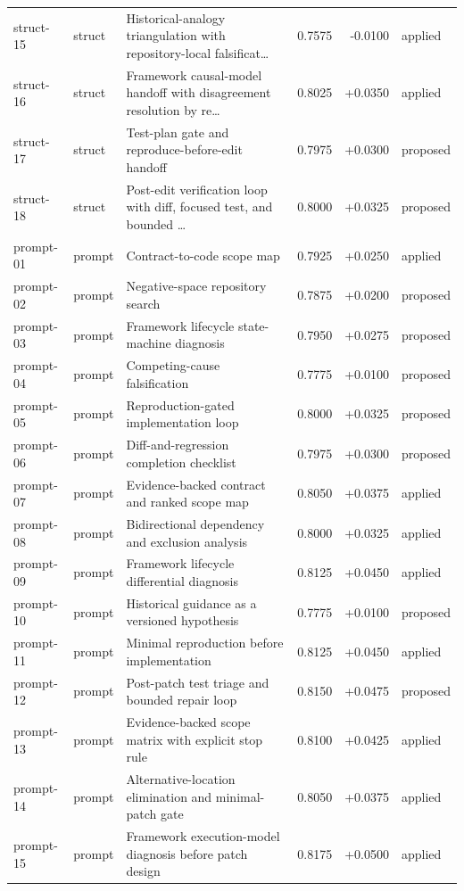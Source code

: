 \begin{center}
\begin{longtable}{llp{5.2cm}rrl}
struct-15 & struct & Historical-analogy triangulation with repository-local falsificat\ldots{} & 0.7575 & -0.0100 & applied \\
struct-16 & struct & Framework causal-model handoff with disagreement resolution by re\ldots{} & 0.8025 & +0.0350 & applied \\
struct-17 & struct & Test-plan gate and reproduce-before-edit handoff & 0.7975 & +0.0300 & proposed \\
struct-18 & struct & Post-edit verification loop with diff, focused test, and bounded \ldots{} & 0.8000 & +0.0325 & proposed \\
prompt-01 & prompt & Contract-to-code scope map & 0.7925 & +0.0250 & applied \\
prompt-02 & prompt & Negative-space repository search & 0.7875 & +0.0200 & proposed \\
prompt-03 & prompt & Framework lifecycle state-machine diagnosis & 0.7950 & +0.0275 & proposed \\
prompt-04 & prompt & Competing-cause falsification & 0.7775 & +0.0100 & proposed \\
prompt-05 & prompt & Reproduction-gated implementation loop & 0.8000 & +0.0325 & proposed \\
prompt-06 & prompt & Diff-and-regression completion checklist & 0.7975 & +0.0300 & proposed \\
prompt-07 & prompt & Evidence-backed contract and ranked scope map & 0.8050 & +0.0375 & applied \\
prompt-08 & prompt & Bidirectional dependency and exclusion analysis & 0.8000 & +0.0325 & applied \\
prompt-09 & prompt & Framework lifecycle differential diagnosis & 0.8125 & +0.0450 & applied \\
prompt-10 & prompt & Historical guidance as a versioned hypothesis & 0.7775 & +0.0100 & proposed \\
prompt-11 & prompt & Minimal reproduction before implementation & 0.8125 & +0.0450 & applied \\
prompt-12 & prompt & Post-patch test triage and bounded repair loop & 0.8150 & +0.0475 & proposed \\
prompt-13 & prompt & Evidence-backed scope matrix with explicit stop rule & 0.8100 & +0.0425 & applied \\
prompt-14 & prompt & Alternative-location elimination and minimal-patch gate & 0.8050 & +0.0375 & applied \\
prompt-15 & prompt & Framework execution-model diagnosis before patch design & 0.8175 & +0.0500 & applied \\

\end{longtable}
\end{center}
